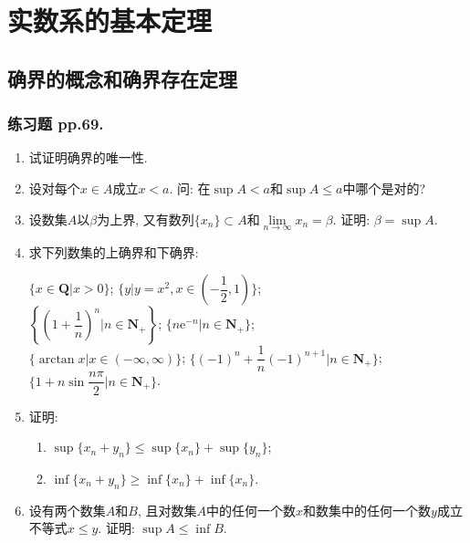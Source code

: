 \documentclass[a4paper,11pt,twoside]{ctexbook}
\newcommand{\e}{\mathrm e}
\begin{document}
\fi
\setcounter{chapter}{2}
\chapter{实数系的基本定理}
\section{确界的概念和确界存在定理}
\subsection{练习题 pp.69.}
\begin{enumerate}
	\item 试证明确界的唯一性.

	\item 设对每个$x\in A$成立$x<a$. 问: 在$\sup{A}<a$和$\sup{A}\leqslant a$中哪个是对的?

	\item 设数集$A$以$\beta$为上界, 又有数列$\{x_n\}\subset A$和$\lim\limits_{n\to\infty} x_n=\beta$. 证明: $\beta=\sup{A}$.

	\item 求下列数集的上确界和下确界:
	      \begin{tabenum}[(1)]
		      \tabenumitem $\{x\in\mathbf{Q}|x>0\}$;
		      \tabenumitem $\{y|y=x^2,x\in(-\dfrac{1}{2},1)\}$;\\
		      \tabenumitem $\left\{\left(1+\dfrac{1}{n}\right)^n | n\in\mathbf{N}_{+}\right\}$;
		      \tabenumitem $\{n\e^{-n}|n\in\mathbf{N}_{+}\}$;\\
		      \tabenumitem $\{\arctan{x}|x\in(-\infty,\infty)\}$;
		      \tabenumitem $\{(-1)^n+\dfrac{1}{n}(-1)^{n+1}|n\in\mathbf{N}_{+}\}$;\\
		      \tabenumitem $\{1+n\sin{\dfrac{n\pi}{2}}|n\in\mathbf{N}_{+}\}$.
	      \end{tabenum}

	\item 证明:
	      \begin{enumerate}[(1)]
		      \item $\sup\{x_n+y_n\}\leqslant\sup\{x_n\}+\sup\{y_n\}$;
		      \item $\inf\{x_n+y_n\}\geqslant\inf\{x_n\}+\inf\{x_n\}$.
	      \end{enumerate}

	\item 设有两个数集$A$和$B$, 且对数集$A$中的任何一个数$x$和数集中的任何一个数$y$成立不等式$x\leqslant y$. 证明: $\sup{A}\leqslant\inf{B}$.


\end{enumerate}
\end{document}
